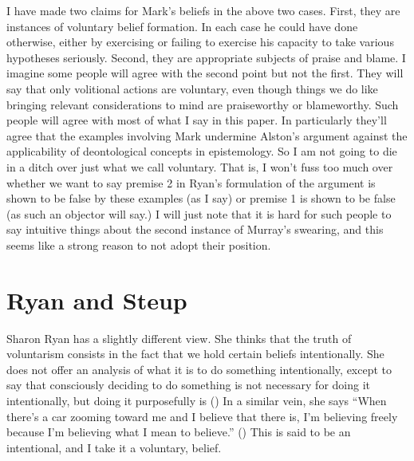 \documentclass[
  11pt,
  letterpaper,
  DIV=11,
  numbers=noendperiod,
  oneside]{scrartcl}
\begin{document}
I have made two claims for Mark's beliefs in the above two cases. First,
they are instances of voluntary belief formation. In each case he could
have done otherwise, either by exercising or failing to exercise his
capacity to take various hypotheses seriously. Second, they are
appropriate subjects of praise and blame. I imagine some people will
agree with the second point but not the first. They will say that only
volitional actions are voluntary, even though things we do like bringing
relevant considerations to mind are praiseworthy or blameworthy. Such
people will agree with most of what I say in this paper. In particularly
they'll agree that the examples involving Mark undermine Alston's
argument against the applicability of deontological concepts in
epistemology. So I am not going to die in a ditch over just what we call
voluntary. That is, I won't fuss too much over whether we want to say
premise 2 in Ryan's formulation of the argument is shown to be false by
these examples (as I say) or premise 1 is shown to be false (as such an
objector will say.) I will just note that it is hard for such people to
say intuitive things about the second instance of Murray's swearing, and
this seems like a strong reason to not adopt their position.

\section{Ryan and Steup}\label{ryan-and-steup}

Sharon Ryan has a slightly different view. She thinks that the truth of
voluntarism consists in the fact that we hold certain beliefs
intentionally. She does not offer an analysis of what it is to do
something intentionally, except to say that consciously deciding to do
something is not necessary for doing it intentionally, but doing it
purposefully is () In a
similar vein, she says ``When there's a car zooming toward me and I
believe that there is, I'm believing freely because I'm believing what I
mean to believe.'' () This is said
to be an intentional, and I take it a voluntary, belief.
\end{document}
